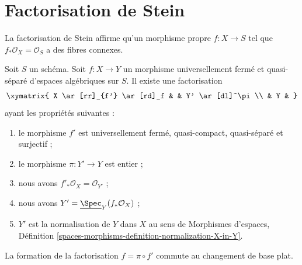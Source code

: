 \section{Factorisation de Stein}
\label{section-stein-factorization}

\noindent
La factorisation de Stein affirme qu'un morphisme propre $f : X \to S$
tel que $f_*\mathcal{O}_X = \mathcal{O}_S$ a des fibres connexes.

\begin{lemma}
\label{lemma-stein-universally-closed}
Soit $S$ un schéma. Soit $f : X \to Y$ un morphisme universellement fermé et
quasi-séparé d'espaces algébriques sur $S$.
Il existe une factorisation
$$
\xymatrix{
X \ar[rr]_{f'} \ar[rd]_f & & Y' \ar[dl]^\pi \\
& Y &
}
$$
ayant les propriétés suivantes :
\begin{enumerate}
\item le morphisme $f'$ est universellement fermé, quasi-compact, quasi-séparé
et surjectif ;
\item le morphisme $\pi : Y' \to Y$ est entier ;
\item nous avons $f'_*\mathcal{O}_X = \mathcal{O}_{Y'}$ ;
\item nous avons $Y' = \underline{\Spec}_Y(f_*\mathcal{O}_X)$ ;
\item $Y'$ est la normalisation de $Y$ dans $X$ au sens de
Morphismes d'espaces, Définition
\ref{spaces-morphisms-definition-normalization-X-in-Y}.
\end{enumerate}
La formation de la factorisation $f = \pi \circ f'$ commute au changement
de base plat.
\end{lemma}

